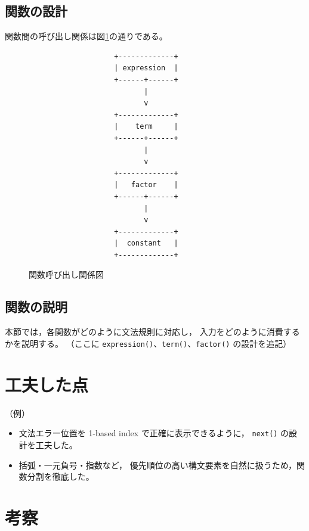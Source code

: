 \documentclass[a4paper,12pt]{jsarticle}
\begin{document}
\subsection{関数の設計}

関数間の呼び出し関係は図\ref{fig:callgraph}の通りである。

\begin{figure}[h]
\centering
\begin{verbatim}
                    +-------------+
                    | expression  |
                    +------+------+ 
                           |
                           v
                    +-------------+
                    |    term     |
                    +------+------+ 
                           |
                           v
                    +-------------+
                    |   factor    |
                    +------+------+ 
                           |
                           v
                    +-------------+
                    |  constant   |
                    +-------------+
\end{verbatim}
\caption{関数呼び出し関係図}
\label{fig:callgraph}
\end{figure}

\subsection{関数の説明}
本節では，各関数がどのように文法規則に対応し，
入力をどのように消費するかを説明する。  
（ここに \verb|expression()|、\verb|term()|、\verb|factor()| の設計を追記）

\section{工夫した点}

（例）
\begin{itemize}
    \item 文法エラー位置を 1-based index で正確に表示できるように，
    \verb|next()| の設計を工夫した。
    \item 括弧・一元負号・指数など，
    優先順位の高い構文要素を自然に扱うため，関数分割を徹底した。
\end{itemize}

\section{考察}
\end{document}
